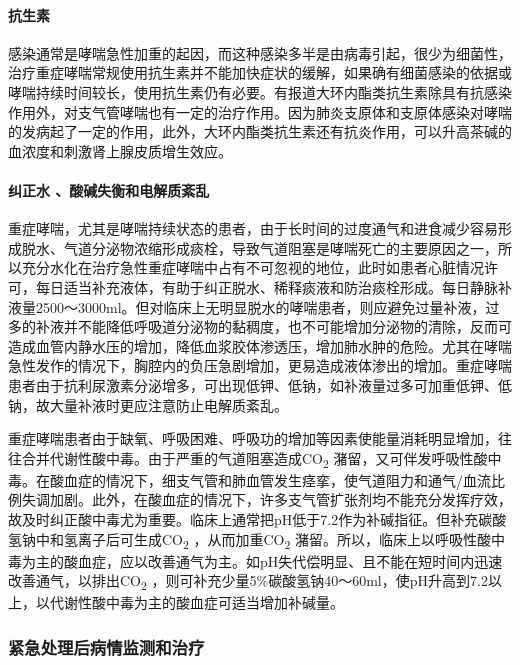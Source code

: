 \paragraph{抗生素}

感染通常是哮喘急性加重的起因，而这种感染多半是由病毒引起，很少为细菌性，治疗重症哮喘常规使用抗生素并不能加快症状的缓解，如果确有细菌感染的依据或哮喘持续时间较长，使用抗生素仍有必要。有报道大环内酯类抗生素除具有抗感染作用外，对支气管哮喘也有一定的治疗作用。因为肺炎支原体和支原体感染对哮喘的发病起了一定的作用，此外，大环内酯类抗生素还有抗炎作用，可以升高茶碱的血浓度和刺激肾上腺皮质增生效应。

\paragraph{纠正水 、酸碱失衡和电解质紊乱}

重症哮喘，尤其是哮喘持续状态的患者，由于长时间的过度通气和进食减少容易形成脱水、气道分泌物浓缩形成痰栓，导致气道阻塞是哮喘死亡的主要原因之一，所以充分水化在治疗急性重症哮喘中占有不可忽视的地位，此时如患者心脏情况许可，每日适当补充液体，有助于纠正脱水、稀释痰液和防治痰栓形成。每日静脉补液量2500～3000ml。但对临床上无明显脱水的哮喘患者，则应避免过量补液，过多的补液并不能降低呼吸道分泌物的黏稠度，也不可能增加分泌物的清除，反而可造成血管内静水压的增加，降低血浆胶体渗透压，增加肺水肿的危险。尤其在哮喘急性发作的情况下，胸腔内的负压急剧增加，更易造成液体渗出的增加。重症哮喘患者由于抗利尿激素分泌增多，可出现低钾、低钠，如补液量过多可加重低钾、低钠，故大量补液时更应注意防止电解质紊乱。

重症哮喘患者由于缺氧、呼吸困难、呼吸功的增加等因素使能量消耗明显增加，往往合并代谢性酸中毒。由于严重的气道阻塞造成CO\textsubscript{2}
潴留，又可伴发呼吸性酸中毒。在酸血症的情况下，细支气管和肺血管发生痉挛，使气道阻力和通气/血流比例失调加剧。此外，在酸血症的情况下，许多支气管扩张剂均不能充分发挥疗效，故及时纠正酸中毒尤为重要。临床上通常把pH低于7.2作为补碱指征。但补充碳酸氢钠中和氢离子后可生成CO\textsubscript{2}
，从而加重CO\textsubscript{2}
潴留。所以，临床上以呼吸性酸中毒为主的酸血症，应以改善通气为主。如pH失代偿明显、且不能在短时间内迅速改善通气，以排出CO\textsubscript{2}
，则可补充少量5\%碳酸氢钠40～60ml，使pH升高到7.2以上，以代谢性酸中毒为主的酸血症可适当增加补碱量。

\subsubsection{紧急处理后病情监测和治疗}

